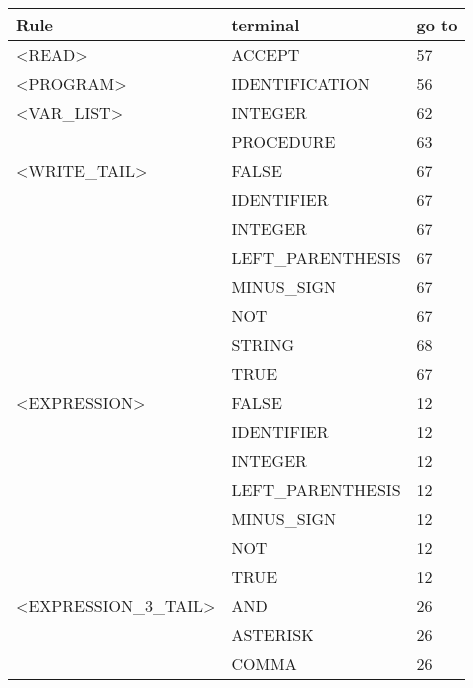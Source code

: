 

\begin{longtable}{|l|l|l|}

\hline

\textbf{Rule}               &   \textbf{terminal}           &   \textbf{go to} \\ \hline
<READ>               &   ACCEPT               &   57 \\ \hline
<PROGRAM>            &   IDENTIFICATION       &   56 \\ \hline
<VAR\_LIST>           &   INTEGER              &   62 \\ \hline
                     &   PROCEDURE            &   63 \\ \hline
<WRITE\_TAIL>         &   FALSE                &   67 \\ \hline
                     &   IDENTIFIER           &   67 \\ \hline
                     &   INTEGER              &   67 \\ \hline
                     &   LEFT\_PARENTHESIS     &   67 \\ \hline
                     &   MINUS\_SIGN           &   67 \\ \hline
                     &   NOT                  &   67 \\ \hline
                     &   STRING               &   68 \\ \hline
                     &   TRUE                 &   67 \\ \hline
<EXPRESSION>         &   FALSE                &   12 \\ \hline
                     &   IDENTIFIER           &   12 \\ \hline
                     &   INTEGER              &   12 \\ \hline
                     &   LEFT\_PARENTHESIS     &   12 \\ \hline
                     &   MINUS\_SIGN           &   12 \\ \hline
                     &   NOT                  &   12 \\ \hline
                     &   TRUE                 &   12 \\ \hline
<EXPRESSION\_3\_TAIL>  &   AND                 &   26 \\ \hline
                     &   ASTERISK             &   26 \\ \hline
                     &   COMMA                &   26 \\ \hline

\end{longtable}
